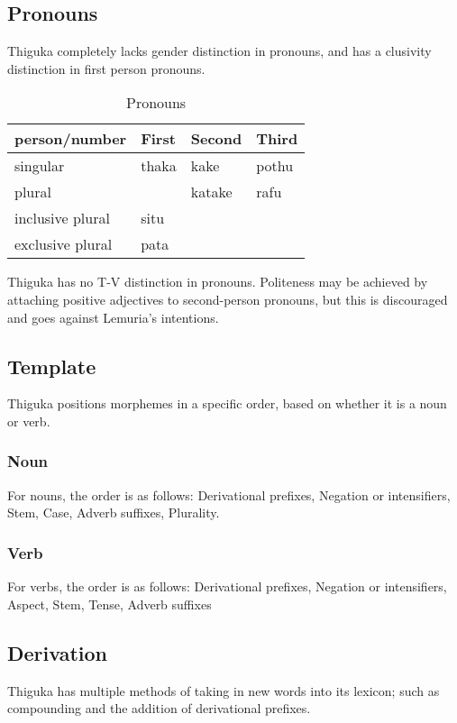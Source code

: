\subsection{Pronouns}
Thiguka completely lacks gender distinction in pronouns, and has a clusivity distinction in first person pronouns.

\begin{table}[h!]
    \centering
    \caption{Pronouns}
    \begin{tabularx}{15cm}{|X|X|X|X|}
        \hline
        person/number & \textbf{First} & \textbf{Second} & \textbf{Third} \\
        \hline
        singular & thaka & kake & pothu \\
        plural   & & katake & rafu \\
        inclusive plural & situ & & \\
        exclusive plural & pata & & \\
        \hline
    \end{tabularx}
\end{table}

Thiguka has no T-V distinction in pronouns. Politeness may be achieved by attaching positive adjectives to second-person pronouns, but this is discouraged and goes against Lemuria's intentions.

\subsection{Template}
Thiguka positions morphemes in a specific order, based on whether it is a noun or verb.

\subsubsection{Noun}
For nouns, the order is as follows: Derivational prefixes, Negation or intensifiers, Stem, Case, Adverb suffixes, Plurality.

\subsubsection{Verb}
For verbs, the order is as follows: Derivational prefixes, Negation or intensifiers, Aspect, Stem, Tense, Adverb suffixes

\subsection{Derivation}
Thiguka has multiple methods of taking in new words into its lexicon; such as compounding and the addition of derivational prefixes.

